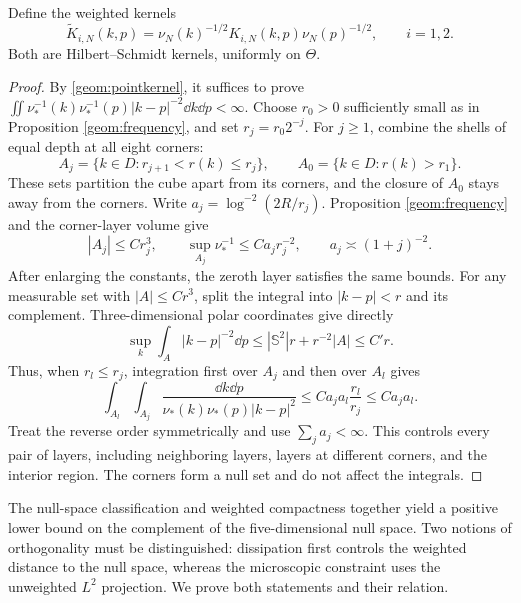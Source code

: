 \begin{lemma}\label{geom:compact}
Define the weighted kernels
\[
 \widetilde K_{i,N}(k,p)
 =\nu_N(k)^{-1/2}K_{i,N}(k,p)\nu_N(p)^{-1/2},\qquad i=1,2.
\]
Both are Hilbert--Schmidt kernels, uniformly on $\Theta$.
\end{lemma}
\begin{proof}
By \eqref{geom:pointkernel}, it suffices to prove
$\iint\nu_*^{-1}(k)\nu_*^{-1}(p)|k-p|^{-2}\dd k\dd p<\infty$.
Choose $r_0>0$ sufficiently small as in Proposition \ref{geom:frequency},
and set $r_j=r_0 2^{-j}$. For $j\ge1$, combine the shells of equal depth
at all eight corners:
\[
 A_j=\{k\in D:r_{j+1}<r(k)\le r_j\},\qquad
 A_0=\{k\in D:r(k)>r_1\}.
\]
These sets partition the cube apart from its corners, and the closure
of $A_0$ stays away from the corners. Write
$a_j=\log^{-2}(2R/r_j)$. Proposition \ref{geom:frequency} and the
corner-layer volume give
\[
 |A_j|\le Cr_j^3,\qquad
 \sup_{A_j}\nu_*^{-1}\le C a_jr_j^{-2},\qquad
 a_j\asymp(1+j)^{-2}.
\]
After enlarging the constants, the zeroth layer satisfies the same bounds.
For any measurable set with $|A|\le Cr^3$, split the integral into
$|k-p|<r$ and its complement. Three-dimensional polar coordinates give directly
\[
 \sup_k\int_A|k-p|^{-2}\dd p
 \le |\mathbb S^2|r+r^{-2}|A|\le C'r.
\]
Thus, when $r_l\le r_j$, integration first over $A_j$ and then over $A_l$ gives
\[
 \int_{A_l}\int_{A_j}
 \frac{\dd k\dd p}{\nu_*(k)\nu_*(p)|k-p|^2}
 \le C a_ja_l\frac{r_l}{r_j}\le C a_ja_l.
\]
Treat the reverse order symmetrically and use $\sum_j a_j<\infty$.
This controls every pair of layers, including neighboring layers,
layers at different corners, and the interior region.
The corners form a null set and do not affect the integrals.
\end{proof}

The null-space classification and weighted compactness together yield
a positive lower bound on the complement of the five-dimensional null space.
Two notions of orthogonality must be distinguished: dissipation first controls
the weighted distance to the null space, whereas the microscopic constraint
uses the unweighted $L^2$ projection. We prove both statements and their relation.

